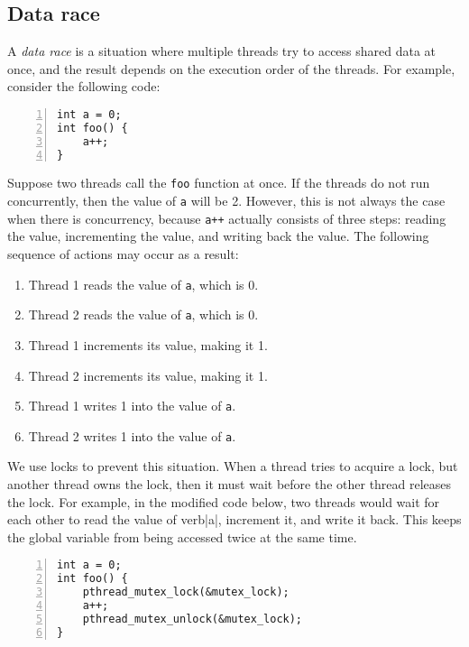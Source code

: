 \subsection{Data race\label{sec:data_race}}

A {\it{data race}} is a situation where multiple threads try to access shared data at once, and the result depends on the execution order of the threads. For example, consider the following code:

\begin{lstlisting}[frame=tb, xleftmargin=2em, framexleftmargin=1.5em, numbers=left]
int a = 0;
int foo() {
    a++;
}
\end{lstlisting}

Suppose two threads call the \verb|foo| function at once. If the threads do not run concurrently, then the value of \verb|a| will be 2. However, this is not always the case when there is concurrency, because \verb|a++| actually consists of three steps: reading the value, incrementing the value, and writing back the value. The following sequence of actions may occur as a result: \begin{enumerate}
    \item Thread 1 reads the value of \verb|a|, which is 0.
    \item Thread 2 reads the value of \verb|a|, which is 0.
    \item Thread 1 increments its value, making it 1.
    \item Thread 2 increments its value, making it 1.
    \item Thread 1 writes 1 into the value of \verb|a|.
    \item Thread 2 writes 1 into the value of \verb|a|.
\end{enumerate}

We use locks to prevent this situation. When a thread tries to acquire a lock, but another thread owns the lock, then it must wait before the other thread releases the lock. For example, in the modified code below, two threads would wait for each other to read the value of verb|a|, increment it, and write it back. This keeps the global variable from being accessed twice at the same time.

\begin{lstlisting}[frame=tb, xleftmargin=2em, framexleftmargin=1.5em, numbers=left]
int a = 0;
int foo() {
    pthread_mutex_lock(&mutex_lock);
    a++;
    pthread_mutex_unlock(&mutex_lock);
}
\end{lstlisting}